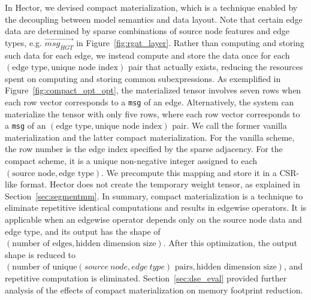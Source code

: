 In Hector, we devised compact materialization, which is a technique enabled by the decoupling between model semantics and data layout. 
Note that certain edge data are determined by sparse combinations of source node features and edge types, e.g.  $\overrightarrow{{msg}_{HGT}}$ in Figure~\ref{fig:rgat_layer}. Rather than computing and storing such data for each edge, we instead compute and store the data once for each $\left(\text{edge type}, \text{unique node index}\right)$ pair  that actually exists, reducing the resources spent on computing and storing common subexpressions.
As exemplified in Figure~\ref{fig:compact_opt_opt}, the materialized tensor involves seven rows when each row vector corresponds to a \texttt{msg} of an edge.
Alternatively, the system can materialize the tensor with only five rows, where each row vector corresponds to a \texttt{msg} of an $\left(\text{edge type}, \text{unique node index}\right)$ pair.
We call the former vanilla materialization and the latter compact materialization.
For the vanilla scheme, the row number is the edge index specified by the sparse adjacency. For the compact scheme, it is a unique non-negative integer assigned to each $(\text{source node}, \text{edge type})$. We precompute this mapping and store it in a CSR-like format. Hector does not create the temporary weight tensor, as explained in Section~\ref{sec:segmentmm}.
In summary, compact materialization is a technique to eliminate repetitive identical computations and results in edgewise operators. It is applicable when an edgewise operator depends only on the source node data and edge type, and its output has the shape of $(\text{number of edges}, \text{hidden dimension size})$. After this optimization, the output shape is reduced to $(\text{number of unique} \allowbreak (source\ \allowbreak node, edge\ type)\text{ pairs}, \text{hidden dimension size})$, and repetitive computation is eliminated.
Section~\ref{sec:dse_eval} provided further analysis of the effects of compact materialization on memory footprint reduction.


